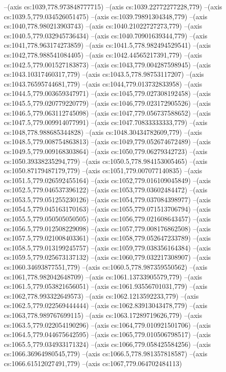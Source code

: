 --(axis cs:1039,778.973848777715)
--(axis cs:1039.22772277228,779)
--(axis cs:1039.5,779.034526051475)
--(axis cs:1039.79891304348,779)
--(axis cs:1040,778.980213903743)
--(axis cs:1040.21022727273,779)
--(axis cs:1040.5,779.032945736434)
--(axis cs:1040.70901639344,779)
--(axis cs:1041,778.963174273859)
--(axis cs:1041.5,778.982494529541)
--(axis cs:1042,778.988541084405)
--(axis cs:1042.44565217391,779)
--(axis cs:1042.5,779.001527183873)
--(axis cs:1043,779.004287598945)
--(axis cs:1043.10317460317,779)
--(axis cs:1043.5,778.98753117207)
--(axis cs:1043.76595744681,779)
--(axis cs:1044,779.013732833958)
--(axis cs:1044.5,779.003659347971)
--(axis cs:1045,779.027308192458)
--(axis cs:1045.5,779.020779220779)
--(axis cs:1046,779.023172905526)
--(axis cs:1046.5,779.063112745098)
--(axis cs:1047,779.056737588652)
--(axis cs:1047.5,779.009914077991)
--(axis cs:1047.70833333333,779)
--(axis cs:1048,778.988685344828)
--(axis cs:1048.30434782609,779)
--(axis cs:1048.5,779.008754863813)
--(axis cs:1049,779.052674672489)
--(axis cs:1049.5,779.009168303864)
--(axis cs:1050,779.06279342723)
--(axis cs:1050.39338235294,779)
--(axis cs:1050.5,778.984153005465)
--(axis cs:1050.87179487179,779)
--(axis cs:1051,779.007077140835)
--(axis cs:1051.5,779.026592455164)
--(axis cs:1052,779.016109045849)
--(axis cs:1052.5,779.046537396122)
--(axis cs:1053,779.03602484472)
--(axis cs:1053.5,779.051255230126)
--(axis cs:1054,779.037084398977)
--(axis cs:1054.5,779.045163170163)
--(axis cs:1055,779.071513706794)
--(axis cs:1055.5,779.050505050505)
--(axis cs:1056,779.021608643457)
--(axis cs:1056.5,779.012508229098)
--(axis cs:1057,779.008176862508)
--(axis cs:1057.5,779.021008403361)
--(axis cs:1058,779.052647233789)
--(axis cs:1058.5,779.013199245757)
--(axis cs:1059,779.038356164384)
--(axis cs:1059.5,779.025673137132)
--(axis cs:1060,779.032217308907)
--(axis cs:1060.34693877551,779)
--(axis cs:1060.5,778.987359550562)
--(axis cs:1061,778.982042648709)
--(axis cs:1061.13733905579,779)
--(axis cs:1061.5,779.053821656051)
--(axis cs:1061.93556701031,779)
--(axis cs:1062,778.993322649573)
--(axis cs:1062.1213592233,779)
--(axis cs:1062.5,779.022569444444)
--(axis cs:1062.83913043478,779)
--(axis cs:1063,778.989767699115)
--(axis cs:1063.17289719626,779)
--(axis cs:1063.5,779.022054190296)
--(axis cs:1064,779.010921501706)
--(axis cs:1064.5,779.044675642595)
--(axis cs:1065,779.010506798517)
--(axis cs:1065.5,779.034933171324)
--(axis cs:1066,779.058425584256)
--(axis cs:1066.36964980545,779)
--(axis cs:1066.5,778.981357818587)
--(axis cs:1066.61512027491,779)
--(axis cs:1067,779.064702484113)
